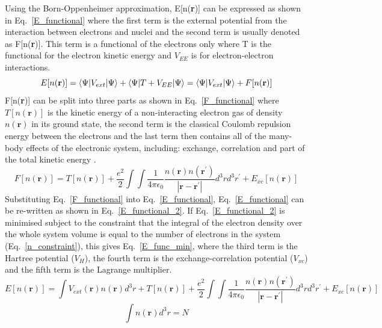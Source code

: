 \documentclass[11pt, twoside]{report}
\begin{document}
Using the Born-Oppenheimer approximation, E[n(\textbf{r})] can be expressed as shown in Eq.~\ref{E_functional} where the first term is the external potential from the interaction between electrons and nuclei and the second term is usually denoted as F[n(\textbf{r})]. This term is a functional of the electrons only where T is the functional for the electron kinetic energy and $V_{EE}$ is for electron-electron interactions.
\begin{equation}\label{E_functional}
E[n(\mathbf{r})] = \braket{\Psi | V_{ext} | \Psi} +  \braket{\Psi | T + V_{EE} | \Psi} = \braket{\Psi | V_{ext} | \Psi} + F[n(\mathbf{r})]
\end{equation}
F[n(\textbf{r})] can be split into three parts as shown in Eq.~\ref{F_functional} where $T[n(\mathbf{r})]$ is the kinetic energy of a non-interacting electron gas of density $n(\mathbf{r})$ in its ground state, the second term is the classical Coulomb repulsion energy between the electrons and the last term then contains all of the many-body effects of the electronic system, including: exchange, correlation and part of the total kinetic energy \cite{Prasad_ch3}.
\begin{equation}\label{F_functional}
F[n(\mathbf{r})] = T[n(\mathbf{r})] + \frac{e^2}{2}\int \int \frac{1}{4\pi \epsilon_0}\frac{n(\mathbf{r})n(\mathbf{r^{\prime}})}{|\mathbf{r} - \mathbf{r^{\prime}}|}d^3rd^3r^{\prime} + E_{xc}[n(\mathbf{r})]
\end{equation}
Substituting Eq.~\ref{F_functional} into Eq.~\ref{E_functional}, Eq.~\ref{E_functional} can be re-written as shown in Eq.~\ref{E_functional_2}. If Eq.~\ref{E_functional_2} is minimised subject to the constraint that the integral of the electron density over the whole system volume is equal to the number of electrons in the system (Eq.~\ref{n_constraint}), this gives Eq.~\ref{E_func_min}, where the third term is the Hartree potential ($V_H$), the fourth term is the exchange-correlation potential ($V_{xc}$) and the fifth term is the Lagrange multiplier.
\begin{equation}\label{E_functional_2}
E[n(\mathbf{r})] = \int V_{ext}(\mathbf{r})n(\mathbf{r})d^3r + T[n(\mathbf{r})] + \frac{e^2}{2}\int \int \frac{1}{4\pi \epsilon_0}\frac{n(\mathbf{r})n(\mathbf{r^{\prime}})}{|\mathbf{r} - \mathbf{r^{\prime}}|}d^3rd^3r^{\prime} + E_{xc}[n(\mathbf{r})]
\end{equation}
\begin{equation}\label{n_constraint}
\int n(\mathbf{r})d^3r = N
\end{equation}
\end{document}
